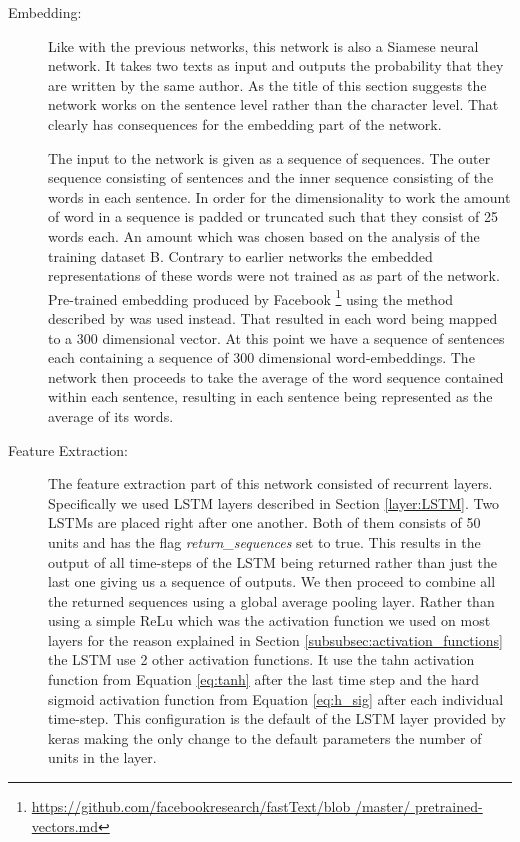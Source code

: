 \begin{description}

    \item[Embedding:]

        Like with the previous networks, this network is also a Siamese neural
        network. It takes two texts as input and outputs the probability that
        they are written by the same author. As the title of this section
        suggests the network works on the sentence level rather than the
        character level. That clearly has consequences for the embedding part of
        the network.

        The input to the network is given as a sequence of sequences. The outer
        sequence consisting of sentences and the inner sequence consisting
        of the words in each sentence. In order for the dimensionality to
        work the amount of word in a sequence is padded or truncated such
        that they consist of 25 words each. An amount which was chosen based
        on the analysis of the training dataset \gls{B}. Contrary to earlier
        networks the embedded representations of these words were not trained
        as as part of the network. Pre-trained embedding produced by Facebook
        \footnote{\url{https://github.com/facebookresearch/fastText/blob
        /master/ pretrained-vectors.md}} using the method described by
        \citet{bojanowski2016enriching} was used instead. That resulted in each
        word being mapped to a 300 dimensional vector. At this point we have
        a sequence of sentences each containing a sequence of 300 dimensional
        word-embeddings. The network then proceeds to take the average of the
        word sequence contained within each sentence, resulting in each sentence
        being represented as the average of its words.

    \item[Feature Extraction:]

        The feature extraction part of this network consisted of recurrent
        layers. Specifically we used \gls{LSTM} layers described in
        Section \ref{layer:LSTM}. Two \glspl{LSTM} are placed right after
        one another. Both of them consists of 50 units and has the flag
        \textit{return\_sequences} set to true. This results in the output
        of all time-steps of the \gls{LSTM} being returned rather than just
        the last one giving us a sequence of outputs. We then proceed to
        combine all the returned sequences using a global average pooling
        layer. Rather than using a simple \gls{ReLu} which was the activation
        function we used on most layers for the reason explained in Section
        \ref{subsubsec:activation_functions} the \gls{LSTM} use 2 other
        activation functions. It use the tahn activation function from Equation
        \eqref{eq:tanh} after the last time step and the hard sigmoid activation
        function from Equation \eqref{eq:h_sig} after each individual time-step.
        This configuration is the default of the \gls{LSTM} layer provided by
        keras making the only change to the default parameters the number of
        units in the layer.


\end{description}
